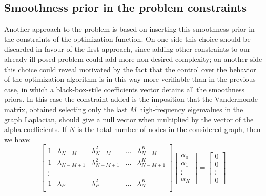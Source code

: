 \subsection{Smoothness prior in the problem constraints}
Another approach to the problem is based on inserting this smoothness prior in the constraints of the optimization function. On one side this choice should be discarded in favour of the first approach, since adding other constraints to our already ill posed problem could add more non-desired complexity; on another side this choice could reveal motivated by the fact that the control over the behavior of the optimization algorithm is in this way more verifiable than in the previous case, in which a black-box-stile coefficients vector detains all the smoothness priors. In this case the constraint added is the imposition that the Vandermonde matrix, obtained selecting only the last $M$ high-frequency eigenvalues in the graph Laplacian, should give a null vector when multiplied by the vector of the alpha coefficients. If $N$ is the total number of nodes in the considered graph, then we have:
\begin{equation}
  \begin{bmatrix}
    1 & \lambda_{N-M} & \lambda_{N-M}^2 & \dots & \lambda_{N-M}^{K} \\
    1 & \lambda_{N-M+1} & \lambda_{N-M+1}^2 & \dots & \lambda_{N-M+1}^{K} \\
    \vdots & & \\
    1 & \lambda_P & \lambda_P^2 & \dots & \lambda_N^K \\
  \end{bmatrix}
  \begin{bmatrix}
    \alpha_0 \\
    \alpha_1 \\
    \vdots \\
    \alpha_K
  \end{bmatrix}
  =
  \begin{bmatrix}
    0\\
    0\\
    \vdots\\
    0
  \end{bmatrix}
\end{equation}
